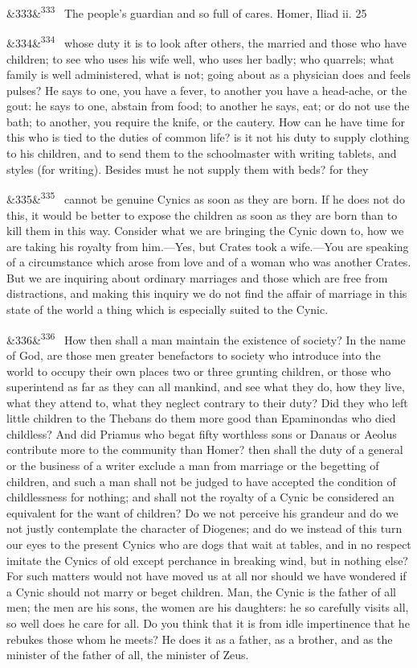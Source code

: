 \documentclass[12pt]{article}
\newcommand{\para}[1][]{\par\noindent\ifx&#1&\else\textsuperscript{\footnotesize #1}~\fi}
\begin{document}
\para[333] The people's guardian and so full of cares. Homer, Iliad ii. 25

\para[334] whose duty it is to look after others, the married and those who have children; to see who uses his wife well, who uses her badly; who quarrels; what family is well administered, what is not; going about as a physician does and feels pulses? He says to one, you have a fever, to another you have a head-ache, or the gout: he says to one, abstain from food; to another he says, eat; or do not use the bath; to another, you require the knife, or the cautery. How can he have time for this who is tied to the duties of common life? is it not his duty to supply clothing to his children, and to send them to the schoolmaster with writing tablets, and styles (for writing). Besides must he not supply them with beds? for they

\para[335] cannot be genuine Cynics as soon as they are born. If he does not do this, it would be better to expose the children as soon as they are born than to kill them in this way. Consider what we are bringing the Cynic down to, how we are taking his royalty from him.—Yes, but Crates took a wife.—You are speaking of a circumstance which arose from love and of a woman who was another Crates. But we are inquiring about ordinary marriages and those which are free from distractions, and making this inquiry we do not find the affair of marriage in this state of the world a thing which is especially suited to the Cynic.

\para[336] How then shall a man maintain the existence of society? In the name of God, are those men greater benefactors to society who introduce into the world to occupy their own places two or three grunting children, or those who superintend as far as they can all mankind, and see what they do, how they live, what they attend to, what they neglect contrary to their duty? Did they who left little children to the Thebans do them more good than Epaminondas who died childless? And did Priamus who begat fifty worthless sons or Danaus or Aeolus contribute more to the community than Homer? then shall the duty of a general or the business of a writer exclude a man from marriage or the begetting of children, and such a man shall not be judged to have accepted the condition of childlessness for nothing; and shall not the royalty of a Cynic be considered an equivalent for the want of children? Do we not perceive his grandeur and do we not justly contemplate the character of Diogenes; and do we instead of this turn our eyes to the present Cynics who are dogs that wait at tables, and in no respect imitate the Cynics of old except perchance in breaking wind, but in nothing else? For such matters would not have moved us at all nor should we have wondered if a Cynic should not marry or beget children. Man, the Cynic is the father of all men; the men are his sons, the women are his daughters: he so carefully visits all, so well does he care for all. Do you think that it is from idle impertinence that he rebukes those whom he meets? He does it as a father, as a brother, and as the minister of the father of all, the minister of Zeus.
\end{document}
